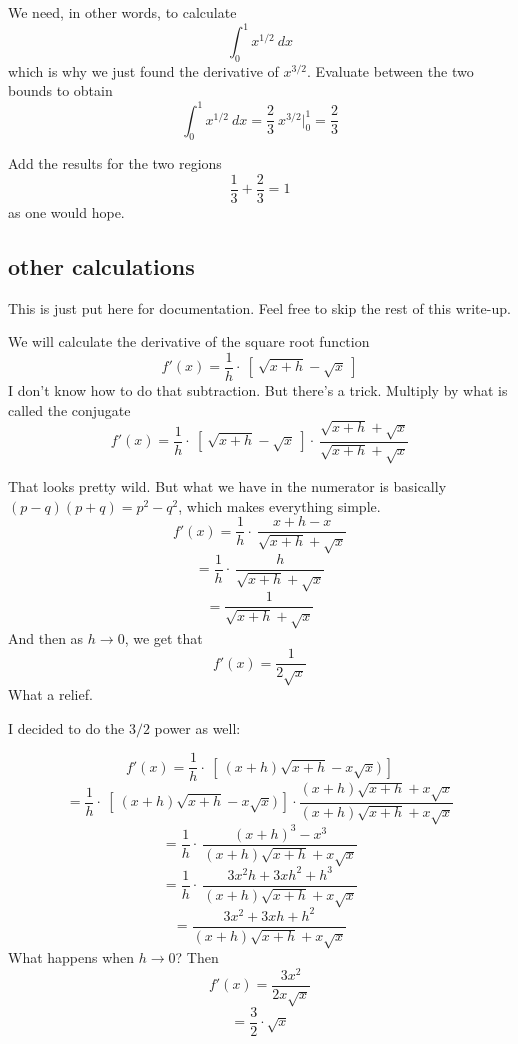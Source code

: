 \documentclass[11pt, oneside]{article}
\begin{document}
We need, in other words, to calculate
\[  \int_0^1 x^{1/2} \ dx \]
which is why we just found the derivative of $x^{3/2}$.  Evaluate between the two bounds to obtain 
\[  \int_0^1 x^{1/2} \ dx = \frac{2}{3} \ x^{3/2}  \bigg|_0^1 = \frac{2}{3} \]

Add the results for the two regions
\[ \frac{1}{3} + \frac{2}{3} = 1 \]
as one would hope.

\subsection*{other calculations}
This is just put here for documentation.  Feel free to skip the rest of this write-up.

We will calculate the derivative of the square root function
\[ f'(x) = \frac{1}{h} \cdot \ [ \ \sqrt{x + h} - \sqrt{x} \ ] \]
I don't know how to do that subtraction.  But there's a trick.  Multiply by what is called the conjugate
\[ f'(x) = \frac{1}{h} \cdot \ [ \ \sqrt{x + h} - \sqrt{x} \ ] \cdot  \ \frac{\sqrt{x + h} + \sqrt{x}}{\sqrt{x + h} + \sqrt{x}}\]

That looks pretty wild.  But what we have in the numerator is basically $(p - q)(p + q) = p^2 - q^2$, which makes everything simple.
\[ f'(x) = \frac{1}{h} \cdot \ \frac{x + h - x}{\sqrt{x + h} + \sqrt{x}} \] 
\[ =  \frac{1}{h} \cdot \ \frac{h}{\sqrt{x + h} + \sqrt{x}} \] 
\[ =  \frac{1}{\sqrt{x + h} + \sqrt{x}} \] 
And then as $h \rightarrow 0$, we get that 
\[ f'(x) = \frac{1}{2 \sqrt{x}} \]
What a relief.

I decided to do the $3/2$ power as well:

\[ f'(x) = \frac{1}{h} \cdot \ [ \  (x + h) \sqrt{x + h} - x \sqrt{x} ) \ ] \] 
\[ = \frac{1}{h} \cdot \ [ \  (x + h) \sqrt{x + h} - x \sqrt{x}) \ ] \cdot \frac{ (x + h) \sqrt{x + h} + x \sqrt{x}}{ (x + h) \sqrt{x + h} + x \sqrt{x}}\] 
\[ = \frac{1}{h} \cdot \ \frac{(x+h)^3 - x^3}{(x + h) \sqrt{x + h} + x \sqrt{x}} \]
\[ = \frac{1}{h} \cdot \ \frac{3x^2h + 3xh^2 +h^3}{(x + h) \sqrt{x + h} + x \sqrt{x}} \]
\[ = \frac{3x^2 + 3xh + h^2}{(x + h) \sqrt{x + h} + x \sqrt{x}} \]
What happens when $h \rightarrow 0$?  Then
\[ f'(x) = \frac{3x^2}{2 x \sqrt{x }} \]
\[ = \frac{3}{2} \cdot \sqrt{x} \]
\end{document}
